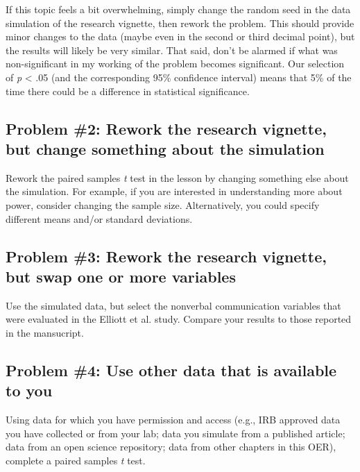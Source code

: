 \documentclass[
  11pt,
]{book}
\begin{document}
If this topic feels a bit overwhelming, simply change the random seed in the data simulation of the research vignette, then rework the problem. This should provide minor changes to the data (maybe even in the second or third decimal point), but the results will likely be very similar. That said, don't be alarmed if what was non-significant in my working of the problem becomes significant. Our selection of \emph{p} \textless{} .05 (and the corresponding 95\% confidence interval) means that 5\% of the time there could be a difference in statistical significance.

\hypertarget{problem-2-rework-the-research-vignette-but-change-something-about-the-simulation-2}{%
\subsection{Problem \#2: Rework the research vignette, but change something about the simulation}\label{problem-2-rework-the-research-vignette-but-change-something-about-the-simulation-2}}

Rework the paired samples \emph{t} test in the lesson by changing something else about the simulation. For example, if you are interested in understanding more about power, consider changing the sample size. Alternatively, you could specify different means and/or standard deviations.

\hypertarget{problem-3-rework-the-research-vignette-but-swap-one-or-more-variables-1}{%
\subsection{Problem \#3: Rework the research vignette, but swap one or more variables}\label{problem-3-rework-the-research-vignette-but-swap-one-or-more-variables-1}}

Use the simulated data, but select the nonverbal communication variables that were evaluated in the Elliott et al. \citeyearpar{elliott_differences_2016}study. Compare your results to those reported in the mansucript.

\hypertarget{problem-4-use-other-data-that-is-available-to-you-1}{%
\subsection{Problem \#4: Use other data that is available to you}\label{problem-4-use-other-data-that-is-available-to-you-1}}

Using data for which you have permission and access (e.g., IRB approved data you have collected or from your lab; data you simulate from a published article; data from an open science repository; data from other chapters in this OER), complete a paired samples \emph{t} test.
\end{document}
